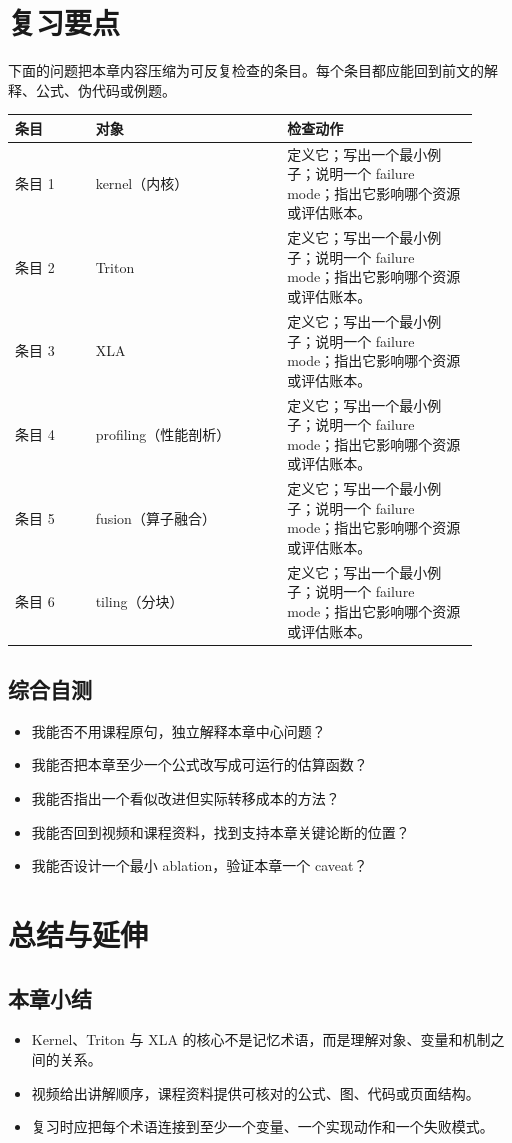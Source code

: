 \documentclass[a4paper]{article}
\begin{document}
\section{复习要点}
下面的问题把本章内容压缩为可反复检查的条目。每个条目都应能回到前文的解释、公式、伪代码或例题。
\begin{longtable}{p{0.16\linewidth}p{0.38\linewidth}p{0.38\linewidth}}
\toprule
\textbf{条目} & \textbf{对象} & \textbf{检查动作}\\
\midrule
条目 1 & kernel（内核） & 定义它；写出一个最小例子；说明一个 failure mode；指出它影响哪个资源或评估账本。\\
条目 2 & Triton & 定义它；写出一个最小例子；说明一个 failure mode；指出它影响哪个资源或评估账本。\\
条目 3 & XLA & 定义它；写出一个最小例子；说明一个 failure mode；指出它影响哪个资源或评估账本。\\
条目 4 & profiling（性能剖析） & 定义它；写出一个最小例子；说明一个 failure mode；指出它影响哪个资源或评估账本。\\
条目 5 & fusion（算子融合） & 定义它；写出一个最小例子；说明一个 failure mode；指出它影响哪个资源或评估账本。\\
条目 6 & tiling（分块） & 定义它；写出一个最小例子；说明一个 failure mode；指出它影响哪个资源或评估账本。\\
\bottomrule
\end{longtable}
\subsection{综合自测}
\begin{itemize}
\item 我能否不用课程原句，独立解释本章中心问题？
\item 我能否把本章至少一个公式改写成可运行的估算函数？
\item 我能否指出一个看似改进但实际转移成本的方法？
\item 我能否回到视频和课程资料，找到支持本章关键论断的位置？
\item 我能否设计一个最小 ablation，验证本章一个 caveat？
\end{itemize}
\section{总结与延伸}
\subsection{本章小结}
\begin{itemize}
\item Kernel、Triton 与 XLA 的核心不是记忆术语，而是理解对象、变量和机制之间的关系。
\item 视频给出讲解顺序，课程资料提供可核对的公式、图、代码或页面结构。
\item 复习时应把每个术语连接到至少一个变量、一个实现动作和一个失败模式。
\end{itemize}
\end{document}
